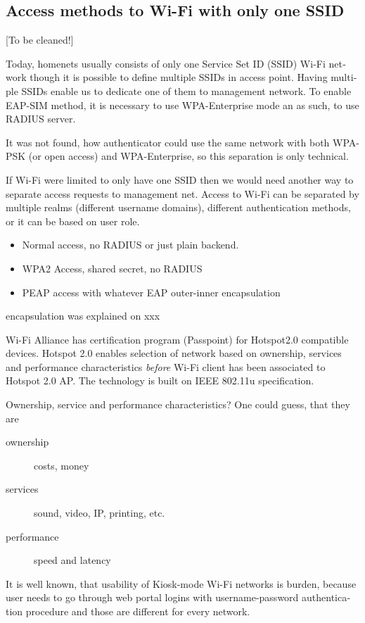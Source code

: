 \documentclass[12pt,a4paper,english]{tutthesis}
\begin{document}
\begin{otherlanguage}{english}
\section{Access methods to Wi-Fi with only one SSID}
\label{sec-4-4}

[To be cleaned!]

Today, homenets usually consists of only one Service Set ID (SSID)
Wi-Fi network though it is possible to define multiple SSIDs in
access point. Having multiple SSIDs enable us to dedicate one of them
to management network. 
To enable EAP-SIM method, it is necessary to use WPA-Enterprise mode
an as such, to use RADIUS server.

It was not found, how authenticator could use the same network with
both WPA-PSK (or open access) and WPA-Enterprise, so
this separation is only technical.


If Wi-Fi were limited to only have one SSID then we would need another way
to separate access requests to management net.  Access to Wi-Fi can be
separated by multiple realms (different username domains), different
authentication methods, or it can be based on user role.
\begin{itemize}
\item Normal access, no RADIUS or just plain backend.
\item WPA2 Access, shared secret, no RADIUS
\item PEAP access with whatever EAP outer-inner encapsulation
\end{itemize}
encapsulation was explained on xxx





Wi-Fi Alliance has certification program (Passpoint) for Hotspot2.0 compatible
devices.  Hotspot 2.0 enables selection of network based on ownership,
services and performance characteristics \emph{before} Wi-Fi client has
been associated to Hotspot 2.0 AP. The technology is built on
IEEE 802.11u specification.


Ownership, service and performance characteristics?
One could guess, that they are
\begin{description}
\item[{ownership}] costs, money
\item[{services}] sound, video, IP, printing, etc.
\item[{performance}] speed and latency
\end{description}

It is well known, that usability of Kiosk-mode Wi-Fi
 networks is burden, because user needs to go through 
web portal logins with username-password authentication 
procedure and those are different for every network.


\end{otherlanguage}
\end{document}
